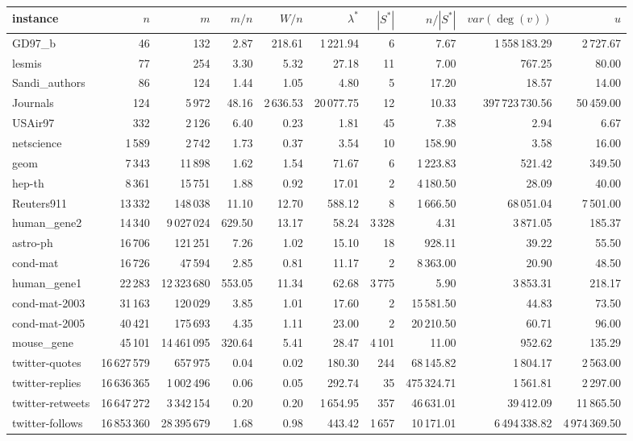 \begin{tabular}{lrrrrrrrrr}
\toprule
instance & $n$ & $m$ & $m/n$ & $W/n$ & $\lambda^*$ & $|S^*|$ & $n/|S^*|$ & $var(\deg(v))$ & $u$ \\
\midrule
GD97\_b & 46 & 132 & 2.87 & 218.61 & 1\,221.94 & 6 & 7.67 & 1\,558\,183.29 & 2\,727.67 \\
lesmis & 77 & 254 & 3.30 & 5.32 & 27.18 & 11 & 7.00 & 767.25 & 80.00 \\
Sandi\_authors & 86 & 124 & 1.44 & 1.05 & 4.80 & 5 & 17.20 & 18.57 & 14.00 \\
Journals & 124 & 5\,972 & 48.16 & 2\,636.53 & 20\,077.75 & 12 & 10.33 & 397\,723\,730.56 & 50\,459.00 \\
USAir97 & 332 & 2\,126 & 6.40 & 0.23 & 1.81 & 45 & 7.38 & 2.94 & 6.67 \\
netscience & 1\,589 & 2\,742 & 1.73 & 0.37 & 3.54 & 10 & 158.90 & 3.58 & 16.00 \\
geom & 7\,343 & 11\,898 & 1.62 & 1.54 & 71.67 & 6 & 1\,223.83 & 521.42 & 349.50 \\
hep-th & 8\,361 & 15\,751 & 1.88 & 0.92 & 17.01 & 2 & 4\,180.50 & 28.09 & 40.00 \\
Reuters911 & 13\,332 & 148\,038 & 11.10 & 12.70 & 588.12 & 8 & 1\,666.50 & 68\,051.04 & 7\,501.00 \\
human\_gene2 & 14\,340 & 9\,027\,024 & 629.50 & 13.17 & 58.24 & 3\,328 & 4.31 & 3\,871.05 & 185.37 \\
astro-ph & 16\,706 & 121\,251 & 7.26 & 1.02 & 15.10 & 18 & 928.11 & 39.22 & 55.50 \\
cond-mat & 16\,726 & 47\,594 & 2.85 & 0.81 & 11.17 & 2 & 8\,363.00 & 20.90 & 48.50 \\
human\_gene1 & 22\,283 & 12\,323\,680 & 553.05 & 11.34 & 62.68 & 3\,775 & 5.90 & 3\,853.31 & 218.17 \\
cond-mat-2003 & 31\,163 & 120\,029 & 3.85 & 1.01 & 17.60 & 2 & 15\,581.50 & 44.83 & 73.50 \\
cond-mat-2005 & 40\,421 & 175\,693 & 4.35 & 1.11 & 23.00 & 2 & 20\,210.50 & 60.71 & 96.00 \\
mouse\_gene & 45\,101 & 14\,461\,095 & 320.64 & 5.41 & 28.47 & 4\,101 & 11.00 & 952.62 & 135.29 \\
twitter-quotes & 16\,627\,579 & 657\,975 & 0.04 & 0.02 & 180.30 & 244 & 68\,145.82 & 1\,804.17 & 2\,563.00 \\
twitter-replies & 16\,636\,365 & 1\,002\,496 & 0.06 & 0.05 & 292.74 & 35 & 475\,324.71 & 1\,561.81 & 2\,297.00 \\
twitter-retweets & 16\,647\,272 & 3\,342\,154 & 0.20 & 0.20 & 1\,654.95 & 357 & 46\,631.01 & 39\,412.09 & 11\,865.50 \\
twitter-follows & 16\,853\,360 & 28\,395\,679 & 1.68 & 0.98 & 443.42 & 1\,657 & 10\,171.01 & 6\,494\,338.82 & 4\,974\,369.50 \\
\bottomrule
\end{tabular}
